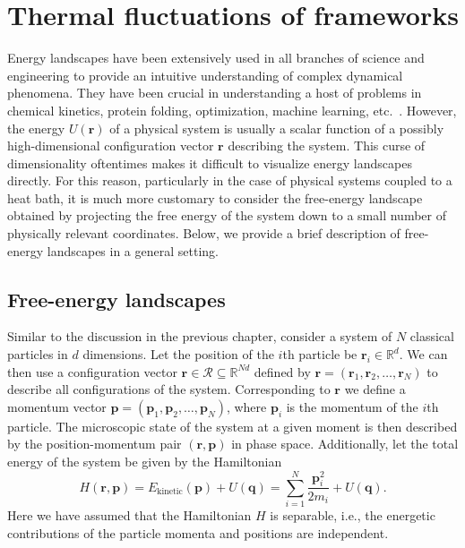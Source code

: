 
\chapter{Thermal fluctuations of frameworks}
\label{chap03}


Energy landscapes have been extensively used in all branches of science and engineering to provide an intuitive understanding of complex dynamical phenomena.
They have been crucial in understanding a host of problems in chemical kinetics, protein folding, optimization, machine learning, etc.~\cite{wales2018}.
However, the energy $U(\bm{r})$ of a physical system is usually a scalar function of a possibly high-dimensional configuration vector $\bm{r}$ describing the system.
This curse of dimensionality oftentimes makes it difficult to visualize energy landscapes directly.
For this reason, particularly in the case of physical systems coupled to a heat bath, it is much more customary to consider the free-energy landscape obtained by projecting the free energy of the system down to a small number of physically relevant coordinates.
Below, we provide a brief description of free-energy landscapes in a general setting.

\section{Free-energy landscapes}

Similar to the discussion in the previous chapter, consider a system of $N$ classical particles in $d$ dimensions.
Let the position of the $i$th particle be $\bm{r}_{i} \in \mathbb{R}^{d}$.
We can then use a configuration vector $\bm{r} \in \mathscr{R} \subseteq \mathbb{R}^{Nd}$ defined by $\bm{r} = (\bm{r}_{1}, \bm{r}_{2}, \ldots, \bm{r}_{N})$ to describe all configurations of the system.
Corresponding to $\bm{r}$ we define a momentum vector $\bm{p} = (\bm{p}_{1}, \bm{p}_{2}, \ldots, \bm{p}_{N})$, where $\bm{p}_{i}$ is the momentum of the $i$th particle.
The microscopic state of the system at a given moment is then described by the position-momentum pair $(\bm{r}, \bm{p})$ in phase space.
Additionally, let the total energy of the system be given by the Hamiltonian
%
\begin{equation}
  H(\bm{r}, \bm{p}) = E_{\text{kinetic}}(\bm{p}) + U(\bm{q}) = \sum_{i=1}^{N} \frac{\bm{p}^{2}_{i}}{2 m_{i}} + U(\bm{q}).
\end{equation}
%
Here we have assumed that the Hamiltonian $H$ is separable, i.e., the energetic contributions of the particle momenta and positions are independent.

